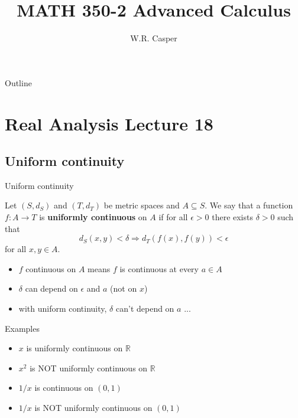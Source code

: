 \documentclass{beamer}
\title{MATH 350-2 Advanced Calculus}
\subtitle
{} %
\author[W.R. Casper] %
{W.R. Casper}
\institute[California State University Fullerton] %
{
  Department of Mathematics\\
  California State University Fullerton}
\begin{document}
\begin{frame}
  \titlepage
\end{frame}

\begin{frame}{Outline}
  \tableofcontents
\end{frame}



\section{Real Analysis Lecture 18}

\subsection{Uniform continuity}

\begin{frame}{Uniform continuity}
\begin{defn}
Let $(S,d_S)$ and $(T,d_T)$ be metric spaces and $A\subseteq S$.
We say that a function $f: A\rightarrow T$ is \textbf{uniformly continuous} on $A$ if for all $\epsilon > 0$ there exists $\delta > 0$ such that
$$d_S(x,y)< \delta \Rightarrow d_T(f(x),f(y))< \epsilon$$
for all $x,y\in A$.
\end{defn}
\begin{itemize}
\item $f$ continuous on $A$ means $f$ is continuous at every $a\in A$
\item $\delta$ can depend on $\epsilon$ and $a$ (not on $x$)
\item with uniform continuity, $\delta$ can't depend on $a$ ...
\end{itemize}
\end{frame}

\begin{frame}{Examples}
\begin{itemize}
\item $x$ is uniformly continuous on $\mathbb R$
\item $x^2$ is NOT uniformly continuous on $\mathbb R$
\item $1/x$ is continuous on $(0,1)$
\item $1/x$ is NOT uniformly continuous on $(0,1)$
\end{itemize}
\end{frame}
\end{document}
